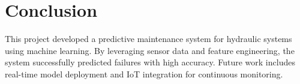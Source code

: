 \documentclass[sigconf]{acmart}
\begin{document}
\section{Conclusion}
This project developed a predictive maintenance system for hydraulic systems using machine learning. By leveraging sensor data and feature engineering, the system successfully predicted failures with high accuracy. Future work includes real-time model deployment and IoT integration for continuous monitoring.
\end{document}
